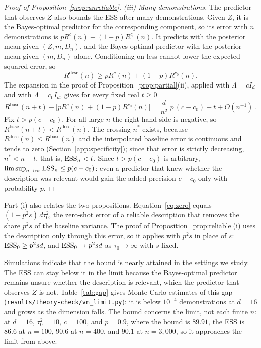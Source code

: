 \begin{proof}[Proof of Proposition~\ref{prop:unreliable}]
\emph{(iii) Many demonstrations.}
The predictor that observes $Z$ also bounds the ESS after many demonstrations. Given $Z$, it is the Bayes-optimal predictor for the corresponding component, so its error with $n$ demonstrations is $pR^{c}(n)+(1-p)R^{c_0}(n)$. It predicts with the posterior mean given $(Z,m,D_n)$, and the Bayes-optimal predictor with the posterior mean given $(m,D_n)$ alone. Conditioning on less cannot lower the expected squared error, so
\[
R^{\mathrm{desc}}(n)\ge pR^{c}(n)+(1-p)R^{c_0}(n).
\]
The expansion in the proof of Proposition~\ref{prop:partial}(ii), applied with $\Lambda=cI_d$ and with $\Lambda=c_0I_d$, gives for every fixed real $t\ge0$
\[
R^{\mathrm{base}}(n+t)-\big[pR^{c}(n)+(1-p)R^{c_0}(n)\big]
=\frac{d}{n^2}\Big[p\,(c-c_0)-t+O(n^{-1})\Big].
\]
Fix $t>p(c-c_0)$. For all large $n$ the right-hand side is negative, so $R^{\mathrm{base}}(n+t)<R^{\mathrm{desc}}(n)$. The crossing $n^*$ exists, because $R^{\mathrm{desc}}(n)\le R^{\mathrm{base}}(n)$ and the interpolated baseline error is continuous and tends to zero (Section~\ref{app:specificity}); since that error is strictly decreasing, $n^*<n+t$, that is, $\mathrm{ESS}_n<t$. Since $t>p(c-c_0)$ is arbitrary, $\limsup_{n\to\infty}\mathrm{ESS}_n\le p(c-c_0)$: even a predictor that knew whether the description was relevant would gain the added precision $c-c_0$ only with probability $p$.
\end{proof}

Part (i) also relates the two propositions. Equation~\eqref{eq:zero} equals $(1-p^2s)\,d\tau_0^2$, the zero-shot error of a reliable description that removes the share $p^2s$ of the baseline variance. The proof of Proposition~\ref{prop:reliable}(i) uses the description only through this error, so it applies with $p^2s$ in place of $s$: $\mathrm{ESS}_0\ge p^2sd$, and $\mathrm{ESS}_0\to p^2sd$ as $\tau_0\to\infty$ with $s$ fixed.

Simulations indicate that the bound is nearly attained in the settings we study. The ESS can stay below it in the limit because the Bayes-optimal predictor remains unsure whether the description is relevant, which the predictor that observes $Z$ is not. Table~\ref{tab:gap} gives Monte Carlo estimates of this gap (\texttt{results/theory-check/vn\_limit.py}): it is below $10^{-4}$ demonstrations at $d=16$ and grows as the dimension falls. The bound concerns the limit, not each finite $n$: at $d=16$, $\tau_0^2=10$, $c=100$, and $p=0.9$, where the bound is $89.91$, the ESS is $86.6$ at $n=100$, $90.6$ at $n=400$, and $90.1$ at $n=3{,}000$, so it approaches the limit from above.

